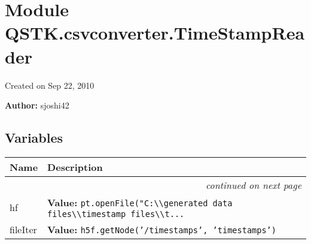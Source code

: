 %
%
%


\section{Module QSTK.csvconverter.TimeStampReader}

    \label{QSTK:csvconverter:TimeStampReader}
Created on Sep 22, 2010

\textbf{Author:} sjoshi42





  \subsection{Variables}

    \vspace{-1cm}
\hspace{\varindent}\begin{longtable}{|p{\varnamewidth}|p{\vardescrwidth}|l}
\cline{1-2}
\cline{1-2} \centering \textbf{Name} & \centering \textbf{Description}& \\
\cline{1-2}
\endhead\cline{1-2}\multicolumn{3}{r}{\small\textit{continued on next page}}\\\endfoot\cline{1-2}
\endlastfoot\raggedright h\-5\-f\- & \raggedright \textbf{Value:} 
{\tt pt.openFile("C:{\textbackslash}{\textbackslash}generated data files{\textbackslash}{\textbackslash}timestamp files{\textbackslash}{\textbackslash}t\texttt{...}}&\\
\cline{1-2}
\raggedright f\-i\-l\-e\-I\-t\-e\-r\- & \raggedright \textbf{Value:} 
{\tt h5f.getNode('/timestamps', 'timestamps')}&\\
\cline{1-2}
\end{longtable}

